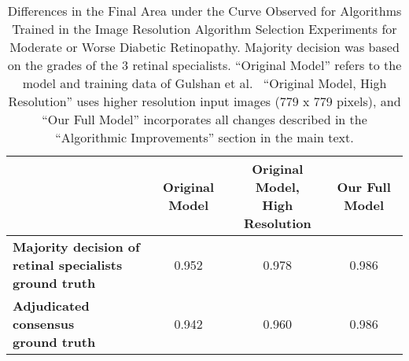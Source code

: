 \documentclass{llncs}
\begin{document}
\begin{table}[t]
  \centering
  \begin{tabular}{|l|c|c|c|}
    \hline
    & \textbf{Original Model} & \makecell{\textbf{Original Model,}\\\textbf{High Resolution}} & \textbf{Our Full Model} \\ \hline
    \makecell{\textbf{Majority decision of }\\\textbf{retinal specialists ground truth}} & 0.952 & 0.978 & 0.986 \\  \hline
    \makecell{\textbf{Adjudicated consensus}\\\textbf{ground truth}} & 0.942 & 0.960 & 0.986 \\  \hline
  \end{tabular}
  \vspace{4mm}
  \caption{
    Differences in the Final Area under the Curve Observed for Algorithms Trained in the Image Resolution Algorithm Selection Experiments for Moderate or Worse Diabetic Retinopathy. Majority decision was based on the grades of the 3 retinal specialists. ``Original Model'' refers to the model and training data of Gulshan et al.~\cite{gulshan2016development} ``Original Model, High Resolution'' uses higher resolution input images (779 x 779 pixels), and ``Our Full Model'' incorporates all changes described in the ``Algorithmic Improvements'' section in the main text.
  }
  \label{table:model_aucs}
\end{table}
\end{document}
